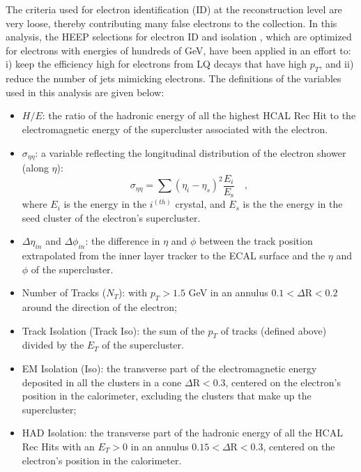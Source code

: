 The criteria used for electron identification (ID) at the reconstruction level are very loose, thereby contributing many false electrons 
to the collection. In this analysis, the HEEP selections for electron ID and isolation \cite{EleID}, which are optimized for 
electrons with energies of hundreds of GeV, have been applied in an effort to: i) keep the efficiency high for electrons from LQ decays that have high $p_{T}$, and 
ii) reduce the number of jets mimicking electrons.
The definitions of the variables used in this analysis are given below:
%
\begin{itemize}
%
\item $H/E$: the ratio of the hadronic energy of all the highest HCAL Rec Hit to the electromagnetic energy of the supercluster associated with the electron.
%
\item $\sigma_{\eta\eta}$: a variable reflecting the longitudinal distribution of the electron shower (along $\eta$):
\begin{displaymath}
\sigma_{\eta\eta} = \sum( \eta_i - \eta_s )^2 \frac{E_i}{E_{\mbox{s}}} \quad ,
\end{displaymath}
where $E_i$ is the energy in the $i^(th)$ crystal, and $E_s$ is the the energy in the seed cluster of the electron's supercluster.
%
\item $\Delta\eta_{in}$ and $\Delta\phi_{in}$: the difference in $\eta$ and $\phi$ between the track position extrapolated from 
the inner layer tracker to the ECAL surface and the $\eta$ and $\phi$ of the supercluster.
%
\item Number of Tracks ($N_T$): with $p_{T}>1.5$ GeV in an annulus $0.1 < \Delta\mbox{R} < 0.2 $ around the direction of the electron;
%
\item Track Isolation (Track Iso): the sum of the $p_{T}$ of tracks (defined above) divided by the $E_{T}$ of the supercluster.


%
\item EM Isolation (Iso): the transverse part of the electromagnetic energy deposited in all the clusters in a cone $\Delta\mbox{R} < 0.3$, 
centered on the electron's position in the calorimeter, excluding the clusters that make up the supercluster;
%
\item HAD Isolation: the transverse part of the hadronic energy of all the HCAL Rec Hits with an $E_{T}>0$ in an annulus
$0.15 < \Delta\mbox{R} < 0.3$, centered on the electron's position in the calorimeter. 
%
\end{itemize}

